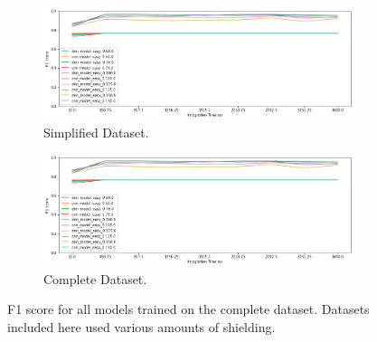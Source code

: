\begin{figure}[H]
     \centering
     \begin{subfigure}[b]{0.9\textwidth}
         \centering
         \includegraphics[width=\textwidth]{images/results_easy_distance_comparison}
         \caption{Simplified Dataset.}
         \label{fig:results_full_background_inject_simple}
     \end{subfigure}

     \begin{subfigure}[b]{0.9\textwidth}
         \centering
         \includegraphics[width=\textwidth]{images/results_easy_distance_comparison}
         \caption{Complete Dataset.}
         \label{fig:results_full_background_inject_full}
     \end{subfigure}
        \caption{F1 score for all models trained on the complete dataset. Datasets included here used various amounts of shielding.}
        \label{fig:results_full_background_inject}
\end{figure}





